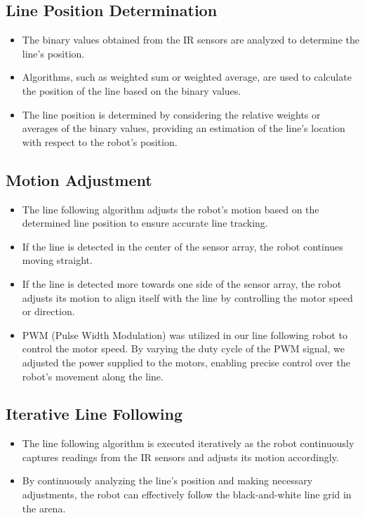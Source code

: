 \documentclass[a4paper,12pt,oneside]{book}
\begin{document}
\subsection{Line Position Determination}
\begin{itemize}
  \item The binary values obtained from the IR sensors are analyzed to determine the line's position.
  \item Algorithms, such as weighted sum or weighted average, are used to calculate the position of the line based on the binary values.
  \item The line position is determined by considering the relative weights or averages of the binary values, providing an estimation of the line's location with respect to the robot's position.
\end{itemize}

\subsection{Motion Adjustment}
\begin{itemize}
    \item The line following algorithm adjusts the robot's motion based on the determined line position to ensure accurate line tracking.
    \item If the line is detected in the center of the sensor array, the robot continues moving straight.
    \item If the line is detected more towards one side of the sensor array, the robot adjusts its motion to align itself with the line by controlling the motor speed or direction.
    \item PWM (Pulse Width Modulation) was utilized in our line following robot to control the motor speed. By varying the duty cycle of the PWM signal, we adjusted the power supplied to the motors, enabling precise control over the robot's movement along the line.
\end{itemize}

\subsection{Iterative Line Following}
\begin{itemize}
  \item The line following algorithm is executed iteratively as the robot continuously captures readings from the IR sensors and adjusts its motion accordingly.
  \item By continuously analyzing the line's position and making necessary adjustments, the robot can effectively follow the black-and-white line grid in the arena.
\end{itemize}
\newpage
\end{document}
